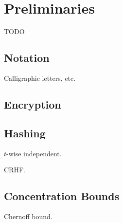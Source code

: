 \chapter{Preliminaries}
TODO

\section{Notation}
Calligraphic letters, etc.

\section{Encryption}

\section{Hashing}
$t$-wise independent.

CRHF.

\section{Concentration Bounds}
Chernoff bound.

